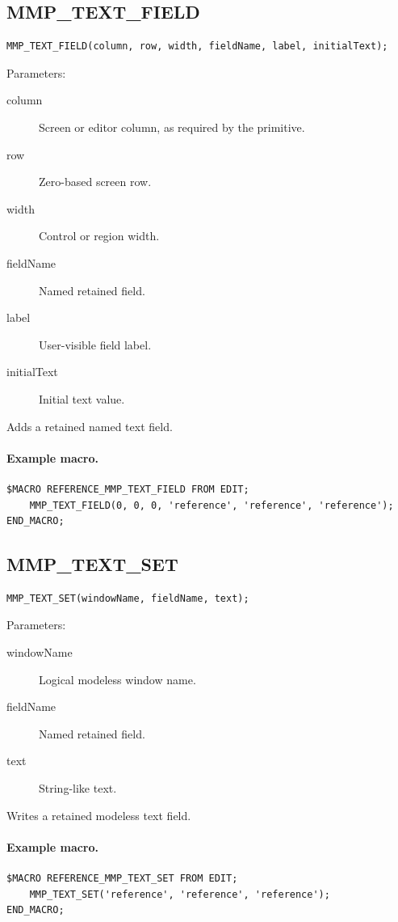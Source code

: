 \documentclass[a4paper,10pt,twoside,openany]{book}
\newenvironment{mrmacextension}{\begin{changebar}}{\end{changebar}}
\begin{document}
\begin{mrmacextension}
\label{prim:procedure-mmp-text-field}
\subsection*{MMP\_TEXT\_FIELD}
\begin{verbatim}
MMP_TEXT_FIELD(column, row, width, fieldName, label, initialText);
\end{verbatim}
Parameters:
\begin{description}
\item[column] Screen or editor column, as required by the primitive.
\item[row] Zero-based screen row.
\item[width] Control or region width.
\item[fieldName] Named retained field.
\item[label] User-visible field label.
\item[initialText] Initial text value.
\end{description}

Adds a retained named text field.

\paragraph{Example macro.}
\begin{verbatim}
$MACRO REFERENCE_MMP_TEXT_FIELD FROM EDIT;
    MMP_TEXT_FIELD(0, 0, 0, 'reference', 'reference', 'reference');
END_MACRO;
\end{verbatim}
\end{mrmacextension}

\begin{mrmacextension}
\label{prim:procedure-mmp-text-set}
\subsection*{MMP\_TEXT\_SET}
\begin{verbatim}
MMP_TEXT_SET(windowName, fieldName, text);
\end{verbatim}
Parameters:
\begin{description}
\item[windowName] Logical modeless window name.
\item[fieldName] Named retained field.
\item[text] String-like text.
\end{description}

Writes a retained modeless text field.

\paragraph{Example macro.}
\begin{verbatim}
$MACRO REFERENCE_MMP_TEXT_SET FROM EDIT;
    MMP_TEXT_SET('reference', 'reference', 'reference');
END_MACRO;
\end{verbatim}
\end{mrmacextension}
\end{document}
